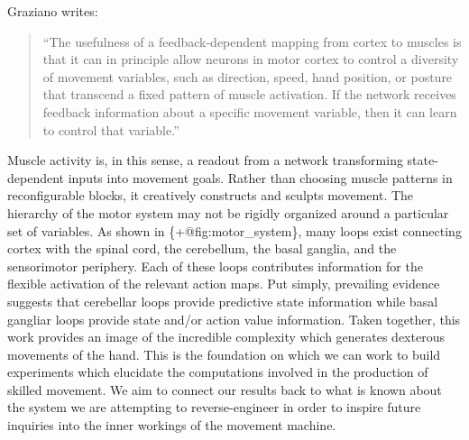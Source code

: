 \documentclass[../main.tex]{subfiles}
\begin{document}
{{{Graziano writes:

\begin{quote}
``The usefulness of a feedback-dependent mapping from cortex to muscles
is that it can in principle allow neurons in motor cortex to control a
diversity of movement variables, such as direction, speed, hand
position, or posture that transcend a fixed pattern of muscle
activation. If the network receives feedback information about a
specific movement variable, then it can learn to control that
variable.''
\end{quote}

Muscle activity is, in this sense, a readout from a network transforming
state-dependent inputs into movement goals. Rather than choosing muscle
patterns in reconfigurable blocks, it creatively constructs and sculpts
movement. The hierarchy of the motor system may not be rigidly organized
around a particular set of variables. As shown in
\{+@fig:motor\_system\}, many loops exist connecting cortex with the
spinal cord, the cerebellum, the basal ganglia, and the sensorimotor
periphery. Each of these loops contributes information for the flexible
activation of the relevant action maps. Put simply, prevailing evidence
suggests that cerebellar loops provide predictive state information
while basal gangliar loops provide state and/or action value
information. Taken together, this work provides an image of the
incredible complexity which generates dexterous movements of the hand.
This is the foundation on which we can work to build experiments which
elucidate the computations involved in the production of skilled
movement. We aim to connect our results back to what is known about the
system we are attempting to reverse-engineer in order to inspire future
inquiries into the inner workings of the movement machine.

}}}
\end{document}
